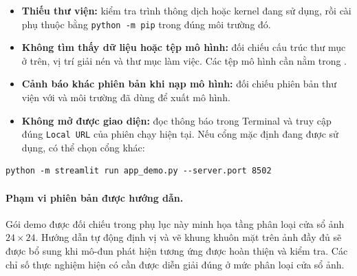 \documentclass[12pt,a4paper,oneside]{report}
\begin{document}
\begin{itemize}
    \item \textbf{Thiếu thư viện:} kiểm tra trình thông dịch hoặc kernel
    đang sử dụng, rồi cài phụ thuộc bằng \texttt{python -m pip}
    trong đúng môi trường đó.
    \item \textbf{Không tìm thấy dữ liệu hoặc tệp mô hình:}
    đối chiếu cấu trúc thư mục ở trên, vị trí giải nén và thư mục làm việc.
    Các tệp mô hình cần nằm trong .
    \item \textbf{Cảnh báo khác phiên bản khi nạp mô hình:}
    đối chiếu phiên bản thư viện với 
    và môi trường đã dùng để xuất mô hình.
    \item \textbf{Không mở được giao diện:} đọc thông báo trong Terminal
    và truy cập đúng \texttt{Local URL} của phiên chạy hiện tại.
    Nếu cổng mặc định đang được sử dụng, có thể chọn cổng khác:
\end{itemize}

\begin{lstlisting}[language={},numbers=none]
python -m streamlit run app_demo.py --server.port 8502
\end{lstlisting}

\paragraph{Phạm vi phiên bản được hướng dẫn.}
Gói demo được đối chiếu trong phụ lục này minh họa tầng phân loại
cửa sổ ảnh $24 \times 24$. Hướng dẫn tự động định vị và vẽ khung khuôn mặt
trên ảnh đầy đủ sẽ được bổ sung khi mô-đun phát hiện tương ứng được
hoàn thiện và kiểm tra. Các chỉ số thực nghiệm hiện có cần được diễn giải
đúng ở mức phân loại cửa sổ ảnh.
\end{document}
